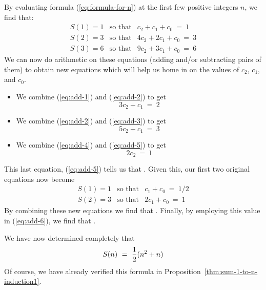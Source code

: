 \noindent By evaluating formula (\ref{eq:formula-for-n}) at the first
few positive integers $n$, we find that:
\begin{eqnarray}
\label{eq:add-1}
S(1) = 1
 & \mbox{so that} &
 c_2 + c_1 + c_0 \ = \ 1 \\
\label{eq:add-2}
S(2) = 3
 & \mbox{so that} &
 4 c_2 + 2 c_1 + c_0 \ = \ 3 \\
\label{eq:add-3}
S(3) = 6
 & \mbox{so that} &
 9 c_2 + 3 c_1 + c_0 \ = \ 6
\end{eqnarray}
We can now do arithmetic on these equations (adding and/or subtracting
pairs of them) to obtain new equations which will help us home in on
the values of $c_2$, $c_1$, and $c_0$.
\begin{itemize}
\item
We combine (\ref{eq:add-1}) and (\ref{eq:add-2}) to get
\begin{equation}
\label{eq:add-4}
3c_2 + c_1 \ = \ 2
\end{equation}

\item
We combine (\ref{eq:add-2}) and (\ref{eq:add-3}) to get
\begin{equation}
\label{eq:add-5}
5 c_2 + c_1 \ = \ 3
\end{equation}

\item
We combine (\ref{eq:add-4}) and (\ref{eq:add-5}) to get
\begin{equation}
\label{eq:add-5}
2 c_2 \ = \ 1
\end{equation}
\end{itemize}
This last equation, (\ref{eq:add-5}) tells us that .  Given this, our first two original equations now
become
\begin{eqnarray}
\label{eq:add-6}
S(1) = 1
 & \mbox{so that} &
c_1 + c_0 \ = \ 1/2 \\
\label{eq:add-7}
S(2) = 3
 & \mbox{so that} &
2 c_1 + c_0 \ = \ 1
\end{eqnarray}
By combining these new equations we find that .  Finally, by employing this value in (\ref{eq:add-6}), we
find that .

\medskip

We have now determined completely that
\[ S(n) \ = \ {1 \over 2}(n^2 + n) \]
Of course, we have already verified this formula in
Proposition~\ref{thm:sum-1-to-n-induction1}.

